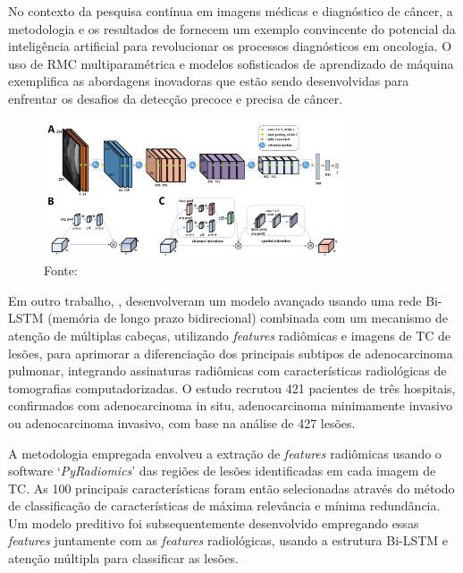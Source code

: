 No contexto da pesquisa contínua em imagens médicas e diagnóstico de câncer, a metodologia e os resultados de \citeauthor{jiangMRIBasedRadiomics2021} fornecem um exemplo convincente do potencial da inteligência artificial para revolucionar os processos diagnósticos em oncologia. O uso de \gls{RMC} multiparamétrica e modelos sofisticados de aprendizado de máquina exemplifica as abordagens inovadoras que estão sendo desenvolvidas para enfrentar os desafios da detecção precoce e precisa de câncer.

\begin{figure}[htbp]
    \centering
    \includegraphics[width=0.8\textwidth]{figures/fig007.png}
    \caption{Fonte: \cite{jiangMRIBasedRadiomics2021}}
    \label{fig:fig007}
\end{figure}

Em outro trabalho, , desenvolveram um modelo avançado usando uma rede Bi-LSTM (memória de longo prazo bidirecional) combinada com um mecanismo de atenção de múltiplas cabeças, utilizando \textit{features} radiômicas e imagens de \gls{TC} de lesões, para aprimorar a diferenciação dos principais subtipos de adenocarcinoma pulmonar, integrando assinaturas radiômicas com características radiológicas de tomografias computadorizadas. O estudo recrutou 421 pacientes de três hospitais, confirmados com adenocarcinoma in situ, adenocarcinoma minimamente invasivo ou adenocarcinoma invasivo, com base na análise de 427 lesões.

A metodologia empregada envolveu a extração de \textit{features} radiômicas usando o software `\textit{PyRadiomics}' das regiões de lesões identificadas em cada imagem de \gls{TC}. As 100 principais características foram então selecionadas através do método de classificação de características de máxima relevância e mínima redundância. Um modelo preditivo foi subsequentemente desenvolvido empregando essas \textit{features} juntamente com as \textit{features} radiológicas, usando a estrutura Bi-LSTM e atenção múltipla para classificar as lesões.

